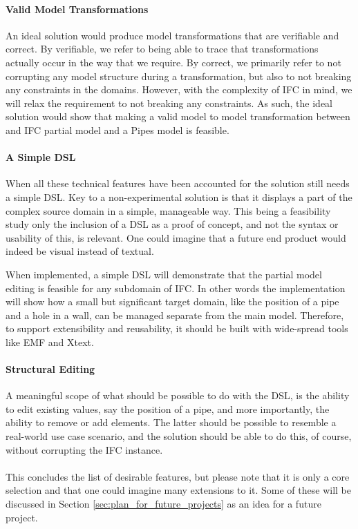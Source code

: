 \paragraph{Valid Model Transformations}
An ideal solution would produce model transformations that are verifiable and correct. By verifiable, we refer to being able to trace that transformations actually occur in the way that we require. By correct, we primarily refer to not corrupting any model structure during a transformation, but also to not breaking any constraints in the domains. However, with the complexity of IFC in mind, we will relax the requirement to not breaking any constraints. As such, the ideal solution would show that making a valid model to model transformation between and IFC partial model and a Pipes model is feasible.

\paragraph{A Simple DSL}
When all these technical features have been accounted for the solution still needs a simple DSL. Key to a non-experimental solution is that it displays a part of the complex source domain in a simple, manageable way.  This being a feasibility study only the inclusion of a DSL as a proof of concept, and not the syntax or usability of this, is relevant. One could imagine that a future end product would indeed be visual instead of textual.

When implemented, a simple DSL will demonstrate that the partial model editing is feasible for any subdomain of IFC. In other words the implementation will show how a small but significant target domain, like the position of a pipe and a hole in a wall, can be managed separate from the main model. Therefore, to support extensibility and reusability, it should be built with wide-spread tools like EMF and Xtext.

\paragraph{Structural Editing}
A meaningful scope of what should be possible to do with the DSL, is the ability to edit existing values, say the position of a pipe, and more importantly, the ability to remove or add elements. The latter should be possible to resemble a real-world use case scenario, and the solution should be able to do this, of course, without corrupting the IFC instance.
\paragraph{}
This concludes the list of desirable features, but please note that it is only a core selection and that one could imagine many extensions to it. Some of these will be discussed in Section \ref{sec:plan_for_future_projects} as an idea for a future project.


